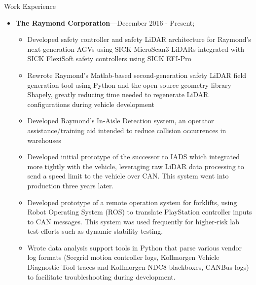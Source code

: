\documentclass[10pt,oneside]{article}
\newenvironment{ressection}[1]{
	\vspace{4pt}
	{\Large#1}
	\begin{itemize}
	\vspace{3pt}
}{
	\end{itemize}
}
\newcommand{\ressubitem}[1]{
	\vspace{-1pt}
	\item \begin{flushleft} #1 \end{flushleft}
}
\newcommand{\resbigitem}[3]{
	\vspace{-5pt}
	\item
	\textbf{#1}---#2; \quad \textit{#3}
}
\newenvironment{ressubsec}[3]{
	\resbigitem{#1}{#2}{#3}
	\vspace{-2pt}
	\begin{itemize}
}{
	\end{itemize}
}
\newenvironment{ressection}[1]{
	\vspace{4pt}
	{\fontfamily{phv}\selectfont\Large#1}
	\begin{itemize}[leftmargin=12pt]
	\vspace{3pt}
}{
	\end{itemize}
}
\newcommand{\ressubitem}[1]{
	\vspace{-1pt}
	\item \begin{flushleft} #1 \end{flushleft}
}
\newcommand{\resbigitem}[2]{
	\vspace{-5pt}
	\item
	\textbf{#1}---\textit{#2}
}
\newenvironment{ressubsec}[2]{
	\resbigitem{#1}{#2}
	\vspace{-2pt}
	\begin{itemize}[leftmargin=12pt]
	}{
	\end{itemize}
	\vfil\penalty-50\vfilneg
}
\begin{document}
\begin{ressection}{Work Experience}

	\begin{ressubsec}{The Raymond Corporation}{December 2016 - Present}
		\ressubitem{Primary maintainer of obstruction detection subsystem for Raymond Courier AGVs - configuration of SICK FlexiSoft safety controller logic and SICK S300 safety LiDAR configuration}
		\ressubitem{Developed safety controller and safety LiDAR architecture for Raymond's next-generation AGVs using SICK MicroScan3 LiDARs integrated with SICK FlexiSoft safety controllers using SICK EFI-Pro}
		\ressubitem{Rewrote Raymond's Matlab-based second-generation safety LiDAR field generation tool using Python and the open source geometry library Shapely, greatly reducing time needed to regenerate LiDAR configurations during vehicle development}
		\ressubitem{Developed Raymond's In-Aisle Detection system, an operator assistance/training aid intended to reduce collision occurrences in warehouses}
		\ressubitem{Developed initial prototype of the successor to IADS which integrated more tightly with the vehicle, leveraging raw LiDAR data processing to send a speed limit to the vehicle over CAN.  This system went into production three years later.}
		\ressubitem{Developed prototype of a remote operation system for forklifts, using Robot Operating System (ROS) to translate PlayStation controller inputs to CAN messages.  This system was used frequently for higher-risk lab test efforts such as dynamic stability testing.}
		\ressubitem{Wrote data analysis support tools in Python that parse various vendor log formats (Seegrid motion controller logs, Kollmorgen Vehicle Diagnostic Tool traces and Kollmorgen NDC8 blackboxes, CANBus logs) to facilitate troubleshooting during development.}
	\end{ressubsec}


\end{ressection}
\end{document}
